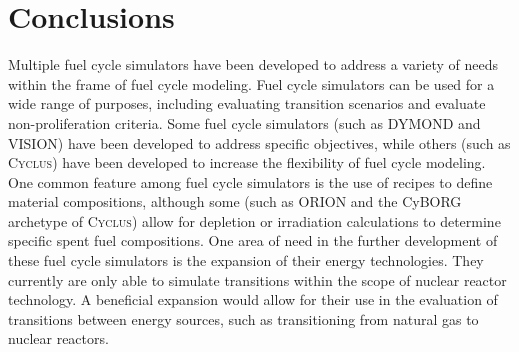 \documentclass{article}
\newcommand{\Cyclus}{\textsc{Cyclus}\xspace}%
\begin{document}
    

\section{Conclusions}
    Multiple fuel cycle simulators have been developed to address a variety 
    of needs within the frame of fuel cycle modeling. Fuel cycle simulators 
    can be used for a wide range of purposes, including evaluating transition
    scenarios and evaluate non-proliferation criteria. Some fuel cycle 
    simulators (such as \gls{DYMOND} and \gls{VISION}) have been developed 
    to address specific objectives, while others (such as \Cyclus)
    have been developed to increase the flexibility of fuel cycle modeling.
    One common feature among fuel cycle simulators is the use of recipes to 
    define material compositions, although some (such as ORION and the CyBORG 
    archetype of \Cyclus) allow for depletion or irradiation calculations 
    to determine specific spent fuel compositions. One area of need in the 
    further development of these fuel cycle simulators is the expansion of their 
    energy technologies. They currently are only able to simulate transitions 
    within the scope of nuclear reactor technology. A beneficial expansion 
    would allow for their use in the evaluation of transitions between energy 
    sources, such as transitioning from natural gas to nuclear reactors. 
% 

   
\end{document}

